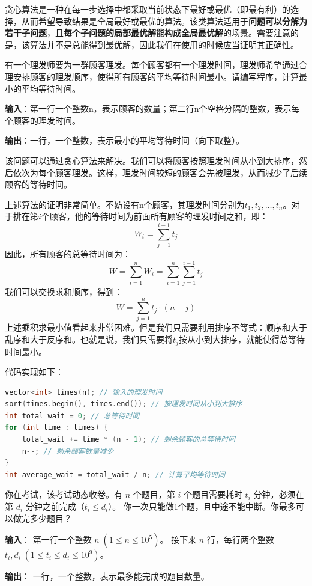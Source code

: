 \documentclass{article}
\begin{document}
贪心算法是一种在每一步选择中都采取当前状态下最好或最优（即最有利）的选择，从而希望导致结果是全局最好或最优的算法。该类算法适用于\textbf{问题可以分解为若干子问题}，且\textbf{每个子问题的局部最优解能构成全局最优解}的场景。需要注意的是，该算法并不是总能得到最优解，因此我们在使用的时候应当证明其正确性。

\begin{example}
  有一个理发师要为一群顾客理发。每个顾客都有一个理发时间，理发师希望通过合理安排顾客的理发顺序，使得所有顾客的平均等待时间最小。请编写程序，计算最小的平均等待时间。

  \textbf{输入}：第一行一个整数n，表示顾客的数量；第二行n个空格分隔的整数，表示每个顾客的理发时间。

  \textbf{输出}：一行，一个整数，表示最小的平均等待时间（向下取整）。
\end{example}

\begin{soln}
  该问题可以通过贪心算法来解决。我们可以将顾客按照理发时间从小到大排序，然后依次为每个顾客理发。这样，理发时间较短的顾客会先被理发，从而减少了后续顾客的等待时间。

  上述算法的证明非常简单。不妨设有n个顾客，其理发时间分别为$t_1,t_2,\dots,t_n$。对于排在第$i$个顾客，他的等待时间为前面所有顾客的理发时间之和，即：
  $$W_i = \sum_{j=1}^{i-1} t_j$$
  因此，所有顾客的总等待时间为：
  $$W = \sum_{i=1}^{n} W_i = \sum_{i=1}^{n} \sum_{j=1}^{i-1} t_j$$
  我们可以交换求和顺序，得到：
  $$W = \sum_{j=1}^{n} t_j \cdot (n - j)$$
  上述乘积求最小值看起来非常困难。但是我们只需要利用排序不等式：顺序和大于乱序和大于反序和。也就是说，我们只需要将$t_j$按从小到大排序，就能使得总等待时间最小。

  代码实现如下：
\begin{lstlisting}[language=C++]
vector<int> times(n); // 输入的理发时间
sort(times.begin(), times.end()); // 按理发时间从小到大排序
int total_wait = 0; // 总等待时间
for (int time : times) {
    total_wait += time * (n - 1); // 剩余顾客的总等待时间
    n--; // 剩余顾客数量减少
}
int average_wait = total_wait / n; // 计算平均等待时间
\end{lstlisting}
\end{soln}

\begin{problem}
  你在考试，该考试动态收卷。有 $n$ 个题目，第 $i$ 个题目需要耗时 $t_i$ 分钟，必须在第 $d_i$ 分钟之前完成（$t_i\le d_i$）。
  你一次只能做1个题，且中途不能中断。你最多可以做完多少题目？

  \textbf{输入}：
  第一行一个整数 $n\;(1\le n\le 10^5)$。
  接下来 $n$ 行，每行两个整数 $t_i,d_i\;(1\le t_i\le d_i\le 10^9)$。

  \textbf{输出}：
  一行，一个整数，表示最多能完成的题目数量。
\end{problem}
\end{document}
